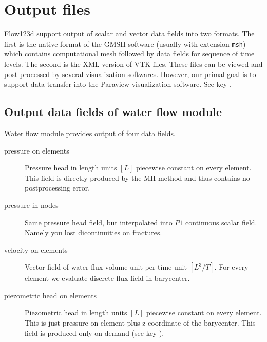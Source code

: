 %
%
%
%

\section{Output files}
\label{section_output}

Flow123d support output of scalar and vector data fields into two formats. The first is the native format of the GMSH software (usually with extension \verb'msh')
which contains computational mesh followed by data fields for sequence of time levels. The second is the XML version of VTK files. These files can be 
viewed and post-processed by several visualization softwares. However, our primal goal is to support data transfer into the Paraview visualization software.
See key . 

\subsection{Output data fields of water flow module}
Water flow module provides output of four data fields. 
\begin{description}
 \item[pressure on elements] Pressure head in length units $[L]$ piecewise constant on every element. This field is directly produced by the MH method and thus contains no postprocessing error.
 \item[pressure in nodes] Same pressure head field, but interpolated into $P1$ continuous scalar field. Namely you lost dicontinuities on fractures.
 \item[velocity on elements] Vector field of water flux volume unit per time unit $[L^3 / T]$. For every element we evaluate discrete flux field in barycenter.
 \item[piezometric head on elements] Piezometric head in length units $[L]$ piecewise constant on every element. This is just pressure on element  plus z-coordinate of the barycenter. This field is produced only on demand
 (see key ).
\end{description}

